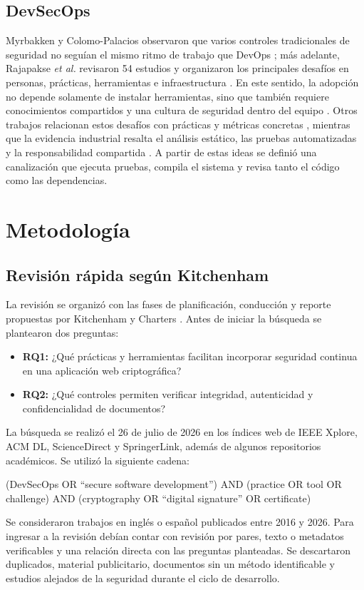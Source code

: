 \documentclass[conference]{IEEEtran}
\begin{document}
\subsection{DevSecOps}
Myrbakken y Colomo-Palacios observaron que varios controles tradicionales de seguridad no seguían el mismo ritmo de trabajo que DevOps \cite{myrbakken2017}; más adelante, Rajapakse \textit{et al.} revisaron 54 estudios y organizaron los principales desafíos en personas, prácticas, herramientas e infraestructura \cite{rajapakse2022}. En este sentido, la adopción no depende solamente de instalar herramientas, sino que también requiere conocimientos compartidos y una cultura de seguridad dentro del equipo \cite{sanchez2020,rahman2019}. Otros trabajos relacionan estos desafíos con prácticas y métricas concretas \cite{akbar2024}, mientras que la evidencia industrial resalta el análisis estático, las pruebas automatizadas y la responsabilidad compartida \cite{zhou2023}. A partir de estas ideas se definió una canalización que ejecuta pruebas, compila el sistema y revisa tanto el código como las dependencias.

\section{Metodología}
\subsection{Revisión rápida según Kitchenham}
La revisión se organizó con las fases de planificación, conducción y reporte propuestas por Kitchenham y Charters \cite{kitchenham2007}. Antes de iniciar la búsqueda se plantearon dos preguntas:
\begin{itemize}
 \item \textbf{RQ1:} ¿Qué prácticas y herramientas facilitan incorporar seguridad continua en una aplicación web criptográfica?
 \item \textbf{RQ2:} ¿Qué controles permiten verificar integridad, autenticidad y confidencialidad de documentos?
\end{itemize}

La búsqueda se realizó el 26 de julio de 2026 en los índices web de IEEE Xplore, ACM DL, ScienceDirect y SpringerLink, además de algunos repositorios académicos. Se utilizó la siguiente cadena:
\par\begingroup
\footnotesize\ttfamily\raggedright
(DevSecOps OR ``secure software development'')\newline
AND (practice OR tool OR challenge)\newline
AND (cryptography OR ``digital signature'' OR certificate)
\par\endgroup
Se consideraron trabajos en inglés o español publicados entre 2016 y 2026. Para ingresar a la revisión debían contar con revisión por pares, texto o metadatos verificables y una relación directa con las preguntas planteadas. Se descartaron duplicados, material publicitario, documentos sin un método identificable y estudios alejados de la seguridad durante el ciclo de desarrollo.
\end{document}
